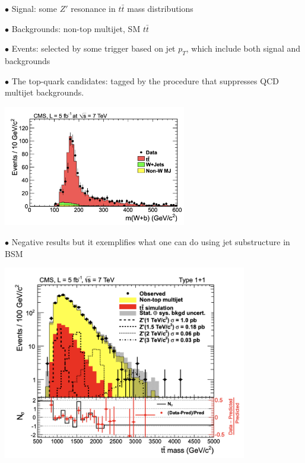 \documentclass[9pt,a4paper,unknownkeysallowed,xcolor=dvipsnames,aspectratio=43]{beamer}
\begin{document}
\begin{frame}\vspace{2mm}

{\color{darkred}\Large$\bullet$ Signal:} some $Z'$ resonance in $t\bar{t}$ mass distributions\\
\vspace{4mm}

{\color{darkred}\Large$\bullet$ Backgrounds:} non-top multijet, SM $t\bar{t}$\\
\vspace{4mm}

{\color{darkred}\Large$\bullet$ Events:} selected by some trigger based on jet $p_T$, which include both signal and backgrounds\\
\vspace{4mm}

{\color{darkred}\Large$\bullet$ The top-quark candidates:} tagged by the procedure that suppresses QCD multijet backgrounds.
\vspace{2mm}
\begin{center}
\includegraphics[width=0.6\textwidth]{05/topcandiates.png}
\end{center}
\end{frame}
%
%
\begin{frame}\vspace{2mm}

{\color{darkred}\Large$\bullet$ Negative results} but it exemplifies what one can do using jet substructure in BSM\\
\vspace{4mm}
\begin{center}
\includegraphics[width=0.8\textwidth]{05/BSM.png}
\end{center}
\end{frame}
\end{document}
